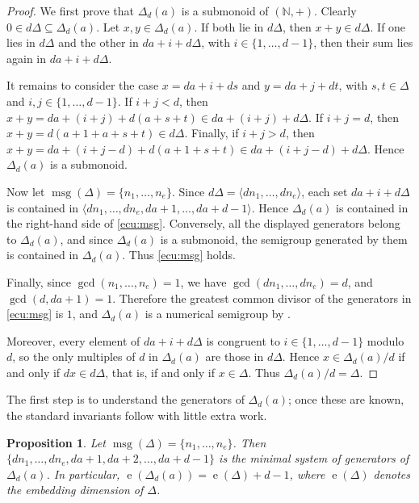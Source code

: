 \documentclass[12pt,a4paper]{amsart}
\newtheorem{proposition}[theorem]{Proposition}
\theoremstyle{definition}
\theoremstyle{remark}
\begin{document}
\begin{proof}
We first prove that $\Delta_d(a)$ is a submonoid of $(\mathbb{N},+)$. Clearly
$0\in d\Delta\subseteq \Delta_d(a)$. Let $x,y\in \Delta_d(a)$. If both lie in $d\Delta$, then
$x+y\in d\Delta$. If one lies in $d\Delta$ and the other in $da+i+d\Delta$, with
$i\in\{1,\dots,d-1\}$, then their sum lies again in $da+i+d\Delta$.

It remains to consider the case $x=da+i+ds$ and $y=da+j+dt$, with
$s,t\in \Delta$ and $i,j\in\{1,\dots,d-1\}$. If $i+j<d$, then
$x+y=da+(i+j)+d(a+s+t)\in da+(i+j)+d\Delta$. If $i+j=d$, then
$x+y=d(a+1+a+s+t)\in d\Delta$. Finally, if $i+j>d$, then
$x+y=da+(i+j-d)+d(a+1+s+t)\in da+(i+j-d)+d\Delta$. Hence $\Delta_d(a)$ is a submonoid.

Now let $\operatorname{msg}(\Delta)=\{n_1,\dots,n_e\}$. Since
$d\Delta=\langle dn_1,\dots,dn_e\rangle$, each set $da+i+d\Delta$ is contained in
$\langle dn_1,\dots,dn_e,da+1,\dots,da+d-1\rangle$. Hence $\Delta_d(a)$ is contained in
the right-hand side of \eqref{ecu:msg}. Conversely, all the displayed generators belong
to $\Delta_d(a)$, and since $\Delta_d(a)$ is a submonoid, the semigroup generated by them is
contained in $\Delta_d(a)$. Thus \eqref{ecu:msg} holds.

Finally, since $\gcd(n_1,\dots,n_e)=1$, we have $\gcd(dn_1,\dots,dn_e)=d$, and
$\gcd(d,da+1)=1$. Therefore the greatest common divisor of the generators in
\eqref{ecu:msg} is $1$, and $\Delta_d(a)$ is a numerical semigroup by
\cite[Lemma~2.1]{book}.

Moreover, every element of $da+i+d\Delta$ is congruent to $i\in\{1,\dots,d-1\}$ modulo
$d$, so the only multiples of $d$ in $\Delta_d(a)$ are those in $d\Delta$. Hence
$x\in \Delta_d(a)/d$ if and only if $dx\in d\Delta$, that is, if and only if $x\in \Delta$. Thus
$\Delta_d(a)/d=\Delta$.
\end{proof}

The first step is to understand the generators of $\Delta_d(a)$; once these are known, the standard invariants follow with little extra work.

\begin{proposition}\label{prop:2}
Let $\operatorname{msg}(\Delta)=\{n_1,\dots,n_e\}$. Then $\{dn_1,\dots,dn_e,da+1,da+2,\dots,da+d-1\}$ is the minimal system of generators of $\Delta_d(a)$. In particular, $\operatorname{e}(\Delta_d(a))=\operatorname{e}(\Delta)+d-1$,
where $\operatorname{e}(\Delta)$ denotes the embedding dimension of $\Delta$.
\end{proposition}
\end{document}
